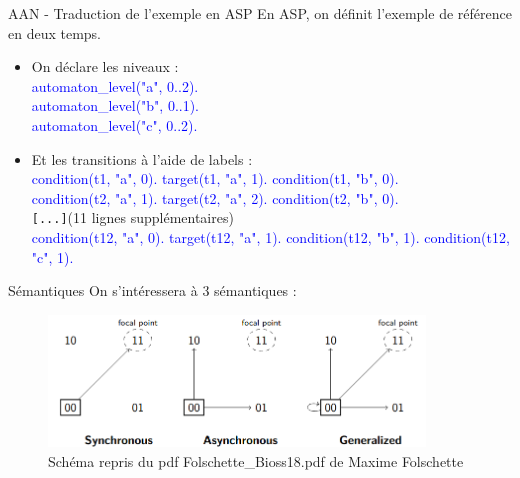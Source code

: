\documentclass{beamer}
\begin{document}
\begin{frame}{AAN - Traduction de l'exemple en ASP}
	En ASP, on définit l'exemple de référence en deux temps.\\
	\begin{itemize}
		\pause
		\item On déclare les niveaux : \\
			\textcolor{blue}{
			automaton\_level("a", 0..2).\\
			automaton\_level("b", 0..1).\\
			automaton\_level("c", 0..2).\\
			}
		\pause
		\item Et les transitions à l'aide de labels : \\
			\textcolor{blue}{
			condition(t1, "a", 0). target(t1, "a", 1). condition(t1, "b", 0).\\
			condition(t2, "a", 1). target(t2, "a", 2). condition(t2, "b", 0).}\\
			\verb![...]!(11 lignes supplémentaires)\\
			\textcolor{blue}{condition(t12, "a", 0). target(t12, "a", 1). condition(t12, "b", 1). condition(t12, "c", 1).\\
			}
	\end{itemize}
\end{frame}

\begin{frame}{Sémantiques}
	\pause
	On s'intéressera à 3 sémantiques : 
	\begin{figure}[!h]
		\pause
		\includegraphics[width=10cm]{Screenshot.png}
		\caption{Schéma repris du pdf Folschette\_Bioss18.pdf de Maxime Folschette}
	\end{figure}
\end{frame}
\end{document}
